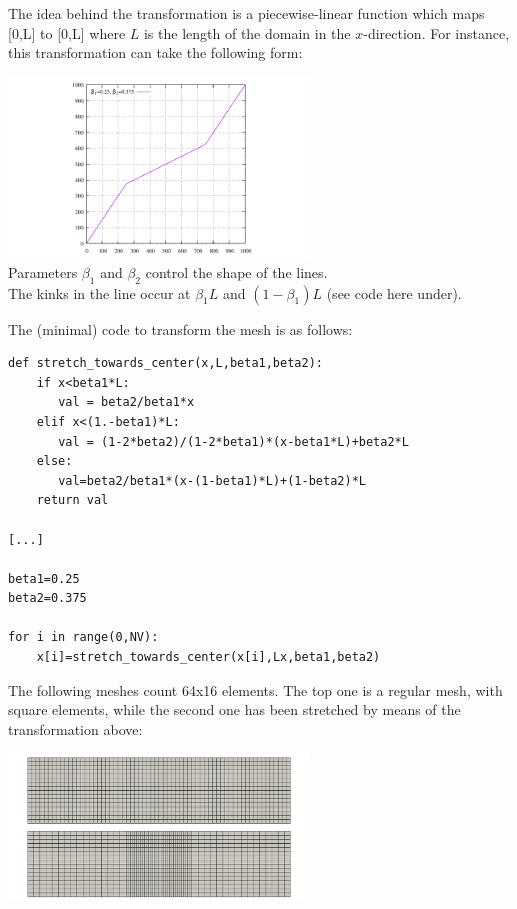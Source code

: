 The idea behind the transformation is a piecewise-linear function which maps [0,L] to [0,L] where 
$L$ is the length of the domain in the $x$-direction. For instance, this transformation can take the following form:

\begin{center}
\includegraphics[width=8cm]{images/meshes/stretching/stretch_towards_center}\\
{\captionfont Parameters $\beta_1$ and $\beta_2$ control the shape of the lines.\\ 
The kinks in the line occur at $\beta_1 L$ and $(1-\beta_1)L$ (see code here under).}
\end{center}

The (minimal) code to transform the mesh is as follows:
\begin{lstlisting}
def stretch_towards_center(x,L,beta1,beta2):
    if x<beta1*L: 
       val = beta2/beta1*x
    elif x<(1.-beta1)*L: 
       val = (1-2*beta2)/(1-2*beta1)*(x-beta1*L)+beta2*L
    else:
       val=beta2/beta1*(x-(1-beta1)*L)+(1-beta2)*L
    return val

[...]

beta1=0.25
beta2=0.375

for i in range(0,NV):
    x[i]=stretch_towards_center(x[i],Lx,beta1,beta2)
\end{lstlisting}

The following meshes count 64x16 elements. The top one is a regular mesh, with square elements, 
while the second one has been stretched by means of the transformation above:

\begin{center}
\includegraphics[width=8cm]{images/meshes/stretching/stretch_x}
\end{center}

